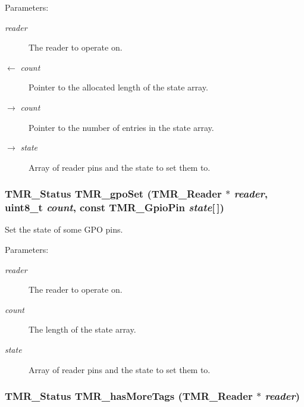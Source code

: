 \begin{Desc}
\item[Parameters:]
\begin{description}
\item[{\em reader}]The reader to operate on. \item[\mbox{$\leftarrow$} {\em count}]Pointer to the allocated length of the state array. \item[\mbox{$\rightarrow$} {\em count}]Pointer to the number of entries in the state array. \item[\mbox{$\rightarrow$} {\em state}]Array of reader pins and the state to set them to. \end{description}
\end{Desc}
\hypertarget{group__reader_g10588e2601ace37292564a877c598334}{
\subsubsection[{TMR\_\-gpoSet}]{\setlength{\rightskip}{0pt plus 5cm}TMR\_\-Status TMR\_\-gpoSet ({\bf TMR\_\-Reader} $\ast$ {\em reader}, \/  uint8\_\-t {\em count}, \/  const {\bf TMR\_\-GpioPin} {\em state}\mbox{[}$\,$\mbox{]})}}
\label{group__reader_g10588e2601ace37292564a877c598334}


Set the state of some GPO pins.

\begin{Desc}
\item[Parameters:]
\begin{description}
\item[{\em reader}]The reader to operate on. \item[{\em count}]The length of the state array. \item[{\em state}]Array of reader pins and the state to set them to. \end{description}
\end{Desc}
\hypertarget{group__reader_g5925392bbb7aeafc0996144f354a533a}{
\subsubsection[{TMR\_\-hasMoreTags}]{\setlength{\rightskip}{0pt plus 5cm}TMR\_\-Status TMR\_\-hasMoreTags ({\bf TMR\_\-Reader} $\ast$ {\em reader})}}
\label{group__reader_g5925392bbb7aeafc0996144f354a533a}


